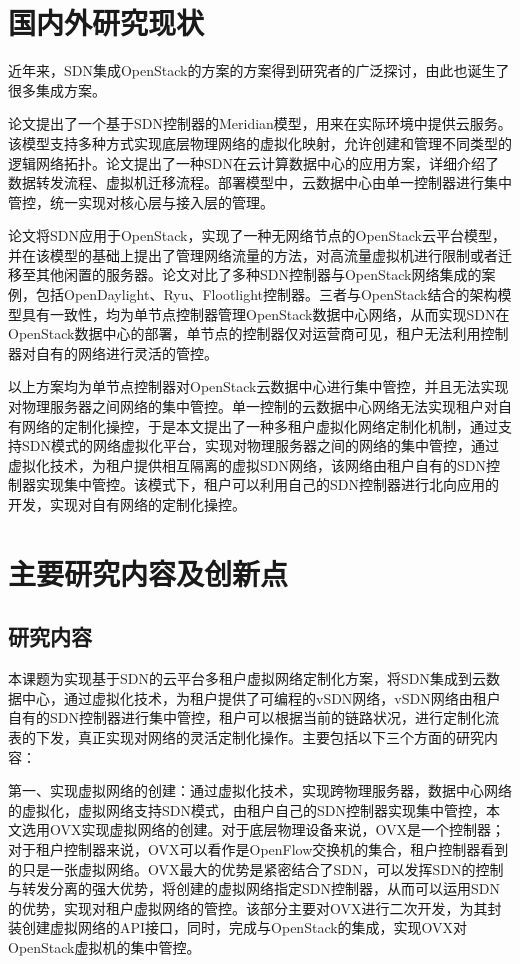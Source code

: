 \section{国内外研究现状}
近年来，SDN集成OpenStack的方案的方案得到研究者的广泛探讨，由此也诞生了很多集成方案。

论文\cite{relate-1}提出了一个基于SDN控制器的Meridian模型，用来在实际环境中提供云服务。该模型支持多种方式实现底层物理网络的虚拟化映射，允许创建和管理不同类型的逻辑网络拓扑。论文\cite{relate-2}提出了一种SDN在云计算数据中心的应用方案，详细介绍了数据转发流程、虚拟机迁移流程。部署模型中，云数据中心由单一控制器进行集中管控，统一实现对核心层与接入层的管理。

论文\cite{relate-3}将SDN应用于OpenStack，实现了一种无网络节点的OpenStack云平台模型，并在该模型的基础上提出了管理网络流量的方法，对高流量虚拟机进行限制或者迁移至其他闲置的服务器。论文\cite{relate-4}对比了多种SDN控制器与OpenStack网络集成的案例，包括OpenDaylight、Ryu、Flootlight控制器。三者与OpenStack结合的架构模型具有一致性，均为单节点控制器管理OpenStack数据中心网络，从而实现SDN在OpenStack数据中心的部署，单节点的控制器仅对运营商可见，租户无法利用控制器对自有的网络进行灵活的管控。

以上方案均为单节点控制器对OpenStack云数据中心进行集中管控，并且无法实现对物理服务器之间网络的集中管控。单一控制的云数据中心网络无法实现租户对自有网络的定制化操控，于是本文提出了一种多租户虚拟化网络定制化机制，通过支持SDN模式的网络虚拟化平台，实现对物理服务器之间的网络的集中管控，通过虚拟化技术，为租户提供相互隔离的虚拟SDN网络，该网络由租户自有的SDN控制器实现集中管控。该模式下，租户可以利用自己的SDN控制器进行北向应用的开发，实现对自有网络的定制化操控。

\section{主要研究内容及创新点}
\subsection{研究内容}
本课题为实现基于SDN的云平台多租户虚拟网络定制化方案，将SDN集成到云数据中心，通过虚拟化技术，为租户提供了可编程的vSDN网络，vSDN网络由租户自有的SDN控制器进行集中管控，租户可以根据当前的链路状况，进行定制化流表的下发，真正实现对网络的灵活定制化操作。主要包括以下三个方面的研究内容：

第一、实现虚拟网络的创建：通过虚拟化技术，实现跨物理服务器，数据中心网络的虚拟化，虚拟网络支持SDN模式，由租户自己的SDN控制器实现集中管控，本文选用\gls*{OVX}\cite{OVX-1}实现虚拟网络的创建。对于底层物理设备来说，OVX是一个控制器；对于租户控制器来说，OVX可以看作是OpenFlow交换机的集合，租户控制器看到的只是一张虚拟网络。OVX最大的优势是紧密结合了SDN，可以发挥SDN的控制与转发分离的强大优势，将创建的虚拟网络指定SDN控制器，从而可以运用SDN的优势，实现对租户虚拟网络的管控。该部分主要对OVX进行二次开发，为其封装创建虚拟网络的API接口，同时，完成与OpenStack的集成，实现OVX对OpenStack虚拟机的集中管控。

